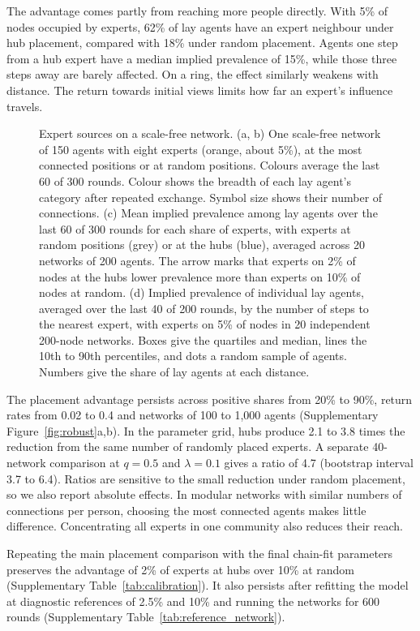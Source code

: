 \documentclass[11pt]{article}
\begin{document}
The advantage comes partly from reaching more people directly. With 5\% of nodes occupied by experts, 62\% of lay agents have an expert neighbour under hub placement, compared with 18\% under random placement. Agents one step from a hub expert have a median implied prevalence of 15\%, while those three steps away are barely affected. On a ring, the effect similarly weakens with distance. The return towards initial views limits how far an expert's influence travels.

\begin{figure}[tbp]
\centering
\resizebox{\textwidth}{!}{\fignet}
\caption{Expert sources on a scale-free network. (a, b) One scale-free network of 150 agents with eight experts (orange, about 5\%), at the most connected positions or at random positions. Colours average the last 60 of 300 rounds. Colour shows the breadth of each lay agent's category after repeated exchange. Symbol size shows their number of connections. (c) Mean implied prevalence among lay agents over the last 60 of 300 rounds for each share of experts, with experts at random positions (grey) or at the hubs (blue), averaged across 20 networks of 200 agents. The arrow marks that experts on 2\% of nodes at the hubs lower prevalence more than experts on 10\% of nodes at random. (d) Implied prevalence of individual lay agents, averaged over the last 40 of 200 rounds, by the number of steps to the nearest expert, with experts on 5\% of nodes in 20 independent 200-node networks. Boxes give the quartiles and median, lines the 10th to 90th percentiles, and dots a random sample of agents. Numbers give the share of lay agents at each distance.}
\label{fig:net}
\end{figure}

The placement advantage persists across positive shares from 20\% to 90\%, return rates from 0.02 to 0.4 and networks of 100 to 1{,}000 agents (Supplementary Figure~\ref{fig:robust}a,b). In the parameter grid, hubs produce 2.1 to 3.8 times the reduction from the same number of randomly placed experts. A separate 40-network comparison at $q=0.5$ and $\lambda=0.1$ gives a ratio of 4.7 (bootstrap interval 3.7 to 6.4). Ratios are sensitive to the small reduction under random placement, so we also report absolute effects. In modular networks with similar numbers of connections per person, choosing the most connected agents makes little difference. Concentrating all experts in one community also reduces their reach.

Repeating the main placement comparison with the final chain-fit parameters preserves the advantage of 2\% of experts at hubs over 10\% at random (Supplementary Table~\ref{tab:calibration}). It also persists after refitting the model at diagnostic references of 2.5\% and 10\% and running the networks for 600 rounds (Supplementary Table~\ref{tab:reference_network}).
\end{document}
